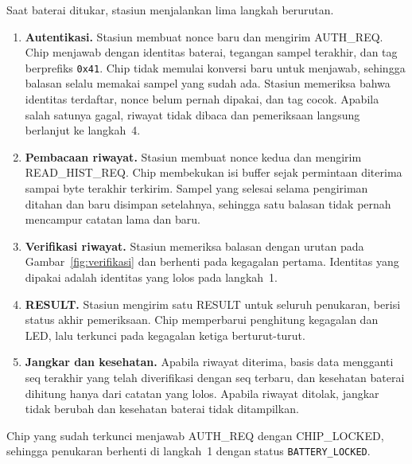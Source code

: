 \documentclass[11pt,a4paper]{article}
\begin{document}
Saat baterai ditukar, stasiun menjalankan lima langkah berurutan.
\begin{enumerate}
  \item \textbf{Autentikasi.} Stasiun membuat nonce baru dan mengirim AUTH\_REQ. Chip menjawab
    dengan identitas baterai, tegangan sampel terakhir, dan tag berprefiks \texttt{0x41}. Chip
    tidak memulai konversi baru untuk menjawab, sehingga balasan selalu memakai sampel yang sudah
    ada. Stasiun memeriksa bahwa identitas terdaftar, nonce belum pernah dipakai, dan tag cocok.
    Apabila salah satunya gagal, riwayat tidak dibaca dan pemeriksaan langsung berlanjut ke
    langkah~4.
  \item \textbf{Pembacaan riwayat.} Stasiun membuat nonce kedua dan mengirim READ\_HIST\_REQ.
    Chip membekukan isi buffer sejak permintaan diterima sampai byte terakhir terkirim. Sampel
    yang selesai selama pengiriman ditahan dan baru disimpan setelahnya, sehingga satu balasan
    tidak pernah mencampur catatan lama dan baru.
  \item \textbf{Verifikasi riwayat.} Stasiun memeriksa balasan dengan urutan pada
    Gambar~\ref{fig:verifikasi} dan berhenti pada kegagalan pertama. Identitas yang dipakai
    adalah identitas yang lolos pada langkah~1.
  \item \textbf{RESULT.} Stasiun mengirim satu RESULT untuk seluruh penukaran, berisi status
    akhir pemeriksaan. Chip memperbarui penghitung kegagalan dan LED, lalu terkunci pada kegagalan
    ketiga berturut-turut.
  \item \textbf{Jangkar dan kesehatan.} Apabila riwayat diterima, basis data mengganti seq
    terakhir yang telah diverifikasi dengan seq terbaru, dan kesehatan baterai dihitung hanya dari
    catatan yang lolos. Apabila riwayat ditolak, jangkar tidak berubah dan kesehatan baterai tidak
    ditampilkan.
\end{enumerate}
Chip yang sudah terkunci menjawab AUTH\_REQ dengan CHIP\_LOCKED, sehingga penukaran berhenti di
langkah~1 dengan status \texttt{BATTERY\_LOCKED}.
\end{document}

